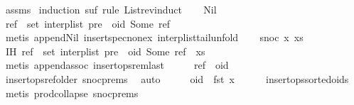 \begin{isabellebody}
%
\isadelimproof
%
\endisadelimproof
%
\isatagproof
{}\isamarkupfalse%
\ assms\ \isamarkupfalse%
{\isacharparenleft}induction\ suf\ rule{\isacharcolon}\ List{\isachardot}rev{\isacharunderscore}induct{\isacharparenright}\isanewline
\ \ \isamarkupfalse%
\ Nil\isanewline
\ \ \isamarkupfalse%
\ \isamarkupfalse%
\ {\isachardoublequoteopen}ref\ {\isasymnotin}\ set\ {\isacharparenleft}interp{\isacharunderscore}list\ {\isacharparenleft}pre\ {\isacharat}\ {\isacharbrackleft}{\isacharparenleft}oid{\isacharcomma}\ Some\ ref{\isacharparenright}{\isacharbrackright}\ {\isacharat}\ {\isacharbrackleft}{\isacharbrackright}{\isacharparenright}{\isacharparenright}{\isachardoublequoteclose}\isanewline
\ \ \ \ \isamarkupfalse%
\ {\isacharparenleft}metis\ append{\isacharunderscore}Nil{}\ insert{\isacharunderscore}spec{\isacharunderscore}nonex\ interp{\isacharunderscore}list{\isacharunderscore}tail{\isacharunderscore}unfold{\isacharparenright}\isanewline
{}\isamarkupfalse%
\isanewline
\ \ \isamarkupfalse%
\ {\isacharparenleft}snoc\ x\ xs{\isacharparenright}\isanewline
\ \ \isamarkupfalse%
\ IH{\isacharcolon}\ {\isachardoublequoteopen}ref\ {\isasymnotin}\ set\ {\isacharparenleft}interp{\isacharunderscore}list\ {\isacharparenleft}pre\ {\isacharat}\ {\isacharbrackleft}{\isacharparenleft}oid{\isacharcomma}\ Some\ ref{\isacharparenright}{\isacharbrackright}\ {\isacharat}\ xs{\isacharparenright}{\isacharparenright}{\isachardoublequoteclose}\isanewline
\ \ \ \ \isamarkupfalse%
\ {\isacharparenleft}metis\ append{\isacharunderscore}assoc\ insert{\isacharunderscore}ops{\isacharunderscore}rem{\isacharunderscore}last{\isacharparenright}\isanewline
\ \ \isamarkupfalse%
\ \isamarkupfalse%
\ {\isachardoublequoteopen}ref\ {\isacharless}\ oid{\isachardoublequoteclose}\isanewline
\ \ \ \ \isamarkupfalse%
\ insert{\isacharunderscore}ops{\isacharunderscore}ref{\isacharunderscore}older\ snoc{\isachardot}prems{\isacharparenleft}{}{\isacharparenright}\ \isamarkupfalse%
\ auto\isanewline
\ \ \isamarkupfalse%
\ \isamarkupfalse%
\ {\isachardoublequoteopen}oid\ {\isacharless}\ fst\ x{\isachardoublequoteclose}\isanewline
\ \ \ \ \isamarkupfalse%
\ insert{\isacharunderscore}ops{\isacharunderscore}sorted{\isacharunderscore}oids\ \isamarkupfalse%
\ {\isacharparenleft}metis\ prod{\isachardot}collapse\ snoc{\isachardot}prems{\isacharparenleft}{}{\isacharparenright}{\isacharparenright}\isanewline

\end{isabellebody}
